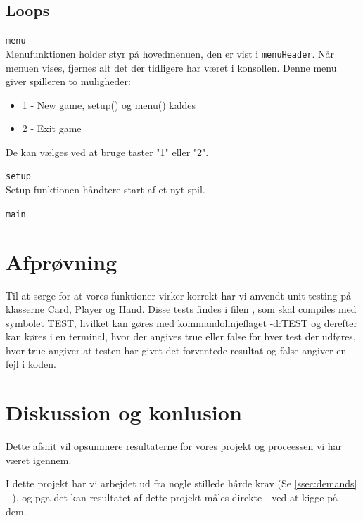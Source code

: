 \documentclass[a4paper]{article}
\newcommand{\namedref}[1]{\autoref{#1} - \nameref{#1}}
\begin{document}
    \subsection{Loops} \label{ssec:loops}
    \begin{description}
      \item{\texttt{menu}}~\\
      Menufunktionen holder styr på hovedmenuen, den er vist i \lstinline$menuHeader$.
      Når menuen vises, fjernes alt det der tidligere har været i konsollen.
      Denne menu giver spilleren to muligheder:
      \begin{itemize}
        \item 1 - New game, setup() og menu() kaldes
        \item 2 - Exit game
      \end{itemize}
      De kan vælges ved at bruge taster "1" eller "2".
      
      \item{\texttt{setup}}~\\
      Setup funktionen håndtere start af et nyt spil.
      
      \item{\texttt{main}}~\\
    \end{description}
      
      
  \section{Afprøvning} \label{sec:unitTest}
    Til at sørge for at vores funktioner virker korrekt har vi
    anvendt unit-testing på klasserne Card, Player og Hand.
    Disse tests findes i filen , som skal
    compiles med symbolet TEST, hvilket kan gøres med
    kommandolinjeflaget -d:TEST og derefter kan køres i en
    terminal, hvor der angives true eller false for hver test
    der udføres, hvor true angiver at testen har givet det
    forventede resultat og false angiver en fejl i koden.

	\section{Diskussion og konlusion} \label{sec:conclusion}
    Dette afsnit vil opsummere resultaterne for vores projekt og proceessen vi har været igennem.

    I dette projekt har vi arbejdet ud fra nogle stillede hårde krav (Se \namedref{ssec:demands}),
    og pga det kan resultatet af dette projekt måles direkte - ved at kigge på dem.
\end{document}
